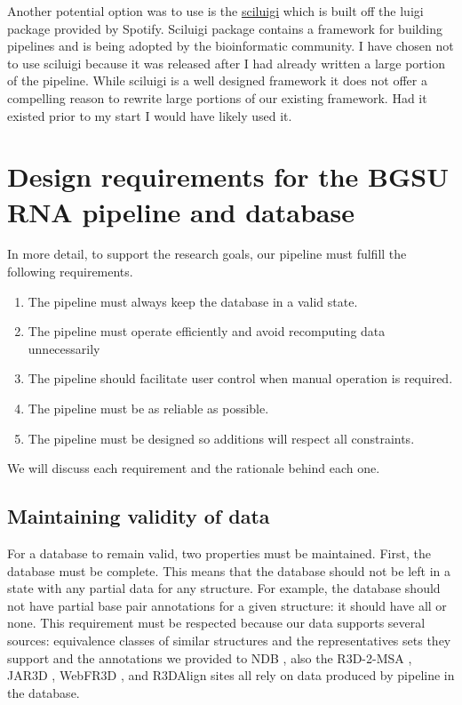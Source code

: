 Another potential option was to use is the
\href{https://github.com/pharmbio/sciluigi}{sciluigi} which is built off the
luigi package provided by Spotify. Sciluigi package contains a framework for
building pipelines and is being adopted by the bioinformatic community. I have
chosen not to use sciluigi because it was released after I had already written a
large portion of the pipeline. While sciluigi is a well designed framework it
does not offer a compelling reason to rewrite large portions of our existing
framework. Had it existed prior to my start I would have likely used it.

\section{Design requirements for the BGSU RNA pipeline and database}

In more detail, to support the research goals, our pipeline must fulfill the
following requirements.

\begin{enumerate}
        \item The pipeline must always keep the database in a valid state.
        \item The pipeline must operate efficiently and avoid recomputing data unnecessarily
        \item The pipeline should facilitate user control when manual operation is required.
        \item The pipeline must be as reliable as possible.
        \item The pipeline must be designed so additions will respect all constraints.
\end{enumerate}

We will discuss each requirement and the rationale behind each one.

\subsection{Maintaining validity of data}

For a database to remain valid, two properties must be maintained. First, the
database must be complete. This means that the database should not be left in a
state with any partial data for any structure. For example, the database should
not have partial base pair annotations for a given structure: it should have all
or none. This requirement must be respected because our data supports several
sources: equivalence classes of similar structures and the representatives sets
they support and the annotations we provided to NDB
\cite{CoimbatoreNarayanan2014}, also the R3D-2-MSA \cite{Cannone2015}, JAR3D
\cite{Roll2016}, WebFR3D \cite{Petrov2011a}, and R3DAlign \cite{Rahrig2013}
sites all rely on data produced by pipeline in the database.

